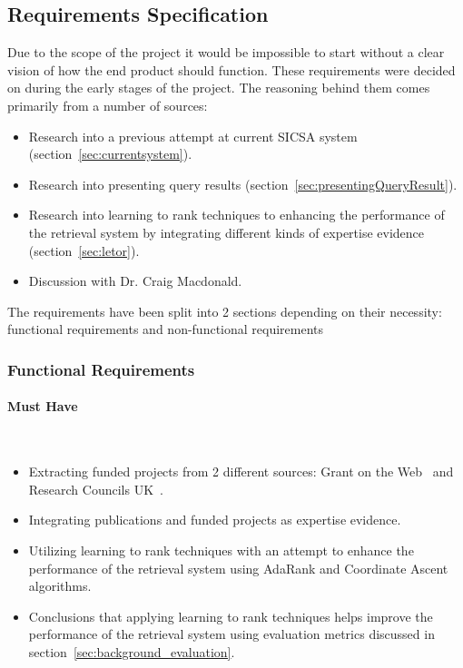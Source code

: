 \subsection{Requirements Specification}\label{sec:requirements}
Due to the scope of the project it would be impossible to start without a clear vision of how
the end product should function. These requirements were decided on during the early stages of the project. 
The reasoning behind them comes primarily from a number of sources:
\begin{itemize}
 \item Research into a previous attempt at current SICSA system (section~\ref{sec:currentsystem}).
 \item Research into presenting query results (section~\ref{sec:presentingQueryResult}).
 \item Research into learning to rank techniques to enhancing the performance of the retrieval system by integrating different kinds of 
 expertise evidence (section~\ref{sec:letor}).
 \item Discussion with Dr. Craig Macdonald.
\end{itemize}
The requirements have been split into 2 sections depending on their necessity: functional requirements and non-functional requirements

\subsubsection{Functional Requirements}
\paragraph{Must Have} \hspace{0pt} \\
\begin{itemize}
 \item Extracting funded projects from 2 different sources: Grant on the Web~\cite{gow} and Research Councils UK~\cite{gtr}.
 \item Integrating publications and funded projects as expertise evidence.
 \item Utilizing learning to rank techniques with an attempt to enhance the performance of the retrieval system using AdaRank and Coordinate Ascent algorithms.
 \item Conclusions that applying learning to rank techniques helps improve the performance of the retrieval system using evaluation metrics discussed
 in section~\ref{sec:background_evaluation}. 
\end{itemize}

